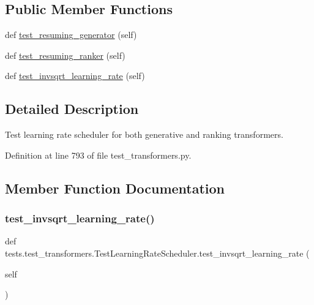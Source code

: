 \subsection*{Public Member Functions}
\begin{DoxyCompactItemize}
\item 
def \hyperlink{classtests_1_1test__transformers_1_1TestLearningRateScheduler_a8c89a354321034bd5717b8e1907cbfeb}{test\+\_\+resuming\+\_\+generator} (self)
\item 
def \hyperlink{classtests_1_1test__transformers_1_1TestLearningRateScheduler_a1f6f7d394258d2170c3005e6dffae8a7}{test\+\_\+resuming\+\_\+ranker} (self)
\item 
def \hyperlink{classtests_1_1test__transformers_1_1TestLearningRateScheduler_aecccd2d60496f6fcd1fd94846fc5ac3c}{test\+\_\+invsqrt\+\_\+learning\+\_\+rate} (self)
\end{DoxyCompactItemize}


\subsection{Detailed Description}
\begin{DoxyVerb}Test learning rate scheduler for both generative and ranking transformers.
\end{DoxyVerb}
 

Definition at line 793 of file test\+\_\+transformers.\+py.



\subsection{Member Function Documentation}
\mbox{\label{classtests_1_1test__transformers_1_1TestLearningRateScheduler_aecccd2d60496f6fcd1fd94846fc5ac3c}} 
\subsubsection{\texorpdfstring{test\+\_\+invsqrt\+\_\+learning\+\_\+rate()}{test\_invsqrt\_learning\_rate()}}
{\footnotesize\ttfamily def tests.\+test\+\_\+transformers.\+Test\+Learning\+Rate\+Scheduler.\+test\+\_\+invsqrt\+\_\+learning\+\_\+rate (\begin{DoxyParamCaption}\item[{}]{self }\end{DoxyParamCaption})}




